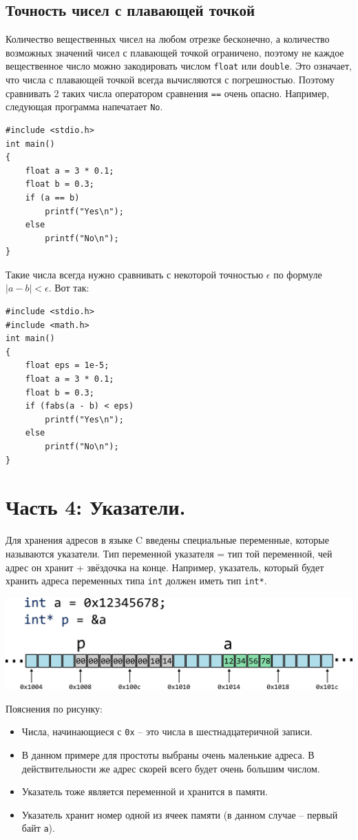 \documentclass{article}
\begin{document}
\subsection*{Точность чисел с плавающей точкой}
Количество вещественных чисел на любом отрезке бесконечно, а количество возможных значений чисел с плавающей точкой ограничено, поэтому не каждое вещественное число можно закодировать числом \texttt{float} или \texttt{double}. Это означает, что числа с плавающей точкой всегда вычисляются с погрешностью. Поэтому сравнивать 2 таких числа оператором сравнения \texttt{==} очень опасно. Например, следующая программа напечатает \texttt{No}.
\begin{lstlisting}
#include <stdio.h>
int main() 
{
    float a = 3 * 0.1;
    float b = 0.3;
    if (a == b)
        printf("Yes\n");
    else
        printf("No\n");
}
\end{lstlisting}

Такие числа всегда нужно сравнивать с некоторой точностью $\epsilon$ по формуле $|a - b| < \epsilon$. Вот так:\\ 
\begin{lstlisting}
#include <stdio.h>
#include <math.h>
int main() 
{
    float eps = 1e-5;
    float a = 3 * 0.1;
    float b = 0.3;
    if (fabs(a - b) < eps)
        printf("Yes\n");
    else
        printf("No\n");
}
\end{lstlisting}


\newpage
\section*{Часть 4: Указатели.}
Для хранения адресов в языке C введены специальные переменные, которые называются указатели. Тип переменной указателя = тип той переменной, чей адрес он хранит + звёздочка на конце. Например, указатель, который будет хранить адреса переменных типа \texttt{int} должен иметь тип \texttt{int*}. \\

\begin{center}
\includegraphics[scale=1]{../images/memory_3_pointer_to_int_b.png}
\end{center}
Пояснения по рисунку:
\begin{itemize}
\item Числа, начинающиеся с \texttt{0x} -- это числа в шестнадцатеричной записи.
\item В данном примере для простоты выбраны очень маленькие адреса. В действительности же адрес скорей всего будет очень большим числом.
\item Указатель тоже является переменной и хранится в памяти.
\item Указатель хранит номер одной из ячеек памяти (в данном случае -- первый байт \texttt{a}).
\end{itemize}
\end{document}
